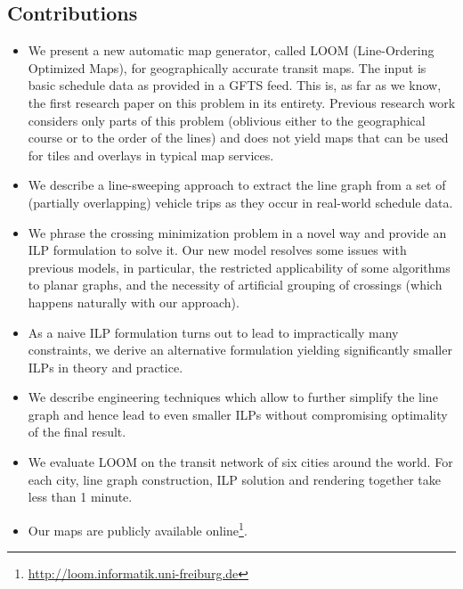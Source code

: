 \documentclass[sigconf]{acmart}
\begin{document}
\subsection{Contributions}\label{SEC:intro:contrib}
\begin{itemize}[topsep=0pt, parsep=0.5mm,leftmargin=0mm,itemindent=4mm,itemsep=-1pt]
\renewcommand\labelitemi{$\bullet$}
\item We present a new automatic map generator, called LOOM (Line-Ordering Optimized Maps), for geographically accurate transit maps. The input is basic schedule data as provided in a GFTS feed.
 This is, as far as we know, the first research paper on this problem in its entirety. Previous research work considers only parts of this problem (oblivious either to the geographical course or to the order of the lines) and does not yield maps that can be used for tiles and overlays in typical map services.

\item We describe a line-sweeping approach to extract the line graph from a set of (partially overlapping) vehicle trips as they occur in real-world schedule data.
\item We phrase the crossing minimization problem in a novel way and provide an ILP formulation to solve it. Our new model resolves some issues with previous models, in particular, the restricted applicability of some algorithms to planar graphs, and the necessity of artificial grouping of crossings (which happens naturally with our approach).

\item As a naive ILP formulation turns out to lead to impractically many constraints, we derive an alternative formulation yielding significantly smaller ILPs in theory and practice.

\item We describe engineering techniques which allow to further simplify the line graph and hence lead to even smaller ILPs without compromising optimality of the final result.

\item We evaluate LOOM on the transit network of six cities around the world.
For each city, line graph construction, ILP solution and rendering together take less than 1 minute.

\item Our maps are publicly available online\footnote{\url{http://loom.informatik.uni-freiburg.de}}.
\end{itemize}
\end{document}
